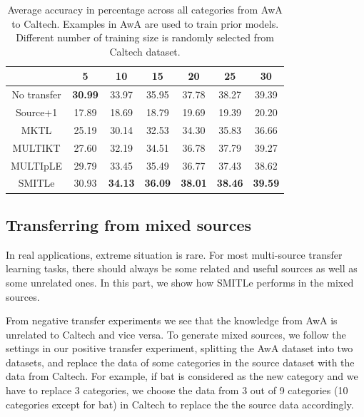 \begin{table}[htbp]
  \centering
  \caption{Average accuracy in percentage across all categories from AwA to Caltech. Examples in AwA are used to train prior models. Different number of training size is randomly selected from Caltech dataset.}
    \begin{tabular}{ccccccc}
    \toprule
                & 5              & 10             & 15             & 20             & 25             & 30 \\
    \midrule
    No transfer &         \textbf{ 30.99 } &         33.97  &         35.95 &         37.78  &         38.27  &         39.39  \\
    Source+1    &         17.89  &         18.69  &         18.79  &         19.69  &         19.39  &         20.20  \\
    MKTL        &         25.19  &         30.14  &         32.53  &         34.30  &         35.83  &         36.66  \\
    MULTIKT     &         27.60  &         32.19  &         34.51  &         36.78  &         37.79  &         39.27  \\
    MULTIpLE    &         29.79  &         33.45  &         35.49  &         36.77  &         37.43  &         38.62  \\
    SMITLe        &       30.93  &         \textbf{ 34.13 } &         \textbf{  36.09 } &         \textbf{38.01} &         \textbf{38.46} &         \textbf{39.59} \\
    \bottomrule
    \end{tabular}%
  \label{tab:A2C}%
\end{table}%

\subsection{Transferring from mixed sources}
In real applications, extreme situation is rare. For most multi-source transfer learning tasks, there should always be some related and useful sources as well as some unrelated ones. In this part, we show how SMITLe performs in the mixed sources.

From negative transfer experiments we see that the knowledge from AwA is unrelated to Caltech and vice versa. To generate mixed sources, we follow the settings in our positive transfer experiment, splitting the AwA dataset into two datasets, and replace the data of some categories in the source dataset with the data from Caltech. 
For example, if bat is considered as the new category and we have to replace 3 categories, we choose the data from 3 out of 9 categories (10 categories except for bat) in Caltech to replace the the source data accordingly. 


